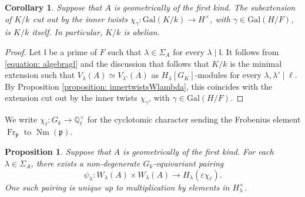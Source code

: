 \documentclass[oneside]{amsart}
\newtheorem{proposition}[theorem]{Proposition}
\newtheorem{corollary}[theorem]{Corollary}
\theoremstyle{remark}
\newcommand{\Q}{\mathbb Q}
\newcommand{\Gal}{\mathrm{Gal}}
\newcommand{\Frob}{\operatorname{Fr}}
\newcommand{\Nm}{\operatorname{Nm}}
\newcommand{\gl}{\mathfrak{l}}
\numberwithin{equation}{section}
\begin{document}
\begin{corollary}\label{cor:cut out}
Suppose that $A$ is geometrically of the first kind. The subextension of $K/k$ cut out by the inner twists $\chi_\gamma:\Gal(K/k)\rightarrow H^\times$, with $\gamma\in \Gal(H/F)$, is $K/k$ itself. In particular, $K/k$ is abelian. 
\end{corollary}

\begin{proof}
Let $\gl$ be a prime of $F$ such that $\lambda \in \Sigma_A$ for every $\lambda\mid \gl$. It follows from \eqref{equation: algebragl} and the discussion that follows that $K/k$ is the minimal extension such that $V_\lambda(A) \simeq V_{\lambda'}(A)$ as $H_\lambda[G_K]$-modules for every $\lambda,\lambda'\mid \ell$. By Proposition \ref{proposition: innertwistsWlambda}, this coincides with the extension cut out by the inner twists $\chi_\gamma$, with $\gamma\in \Gal(H/F)$.
\end{proof}


We write $\chi_\ell:G_k\to \Q_\ell^\times$ for the cyclotomic character sending the Frobenius element $\Frob_{\mathfrak p}$ to $\Nm(\mathfrak p)$.

\begin{proposition}\label{proposition: pairing}
Suppose that $A$ is geometrically of the first kind. For each $\lambda \in \Sigma_A$, there exists a non-degenerate $G_k$-equivariant pairing
$$
\psi_\lambda: W_\lambda(A) \times W_\lambda(A)\rightarrow H_\lambda(\varepsilon \chi_\ell).
$$
One such pairing is unique up to multiplication by elements in $H_\lambda^\times$.
\end{proposition}
\end{document}
